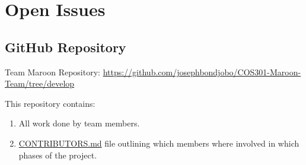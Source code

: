 \documentclass[a4paper,10pt]{article}
\begin{document}
\clearpage
\section{Open Issues}
\subsection {GitHub Repository}
Team Maroon Repository: \url{https://github.com/josephbondjobo/COS301-Maroon-Team/tree/develop}

This repository contains:
\begin{enumerate}
\item All work done by team members.
\item \href{https://github.com/josephbondjobo/COS301-Maroon-Team/blob/develop/Intro/Contributors.md}{CONTRIBUTORS.md} file outlining which members where involved in which phases of the project.
\end{enumerate}



\newpage
\clearpage
{}
\end{document}
